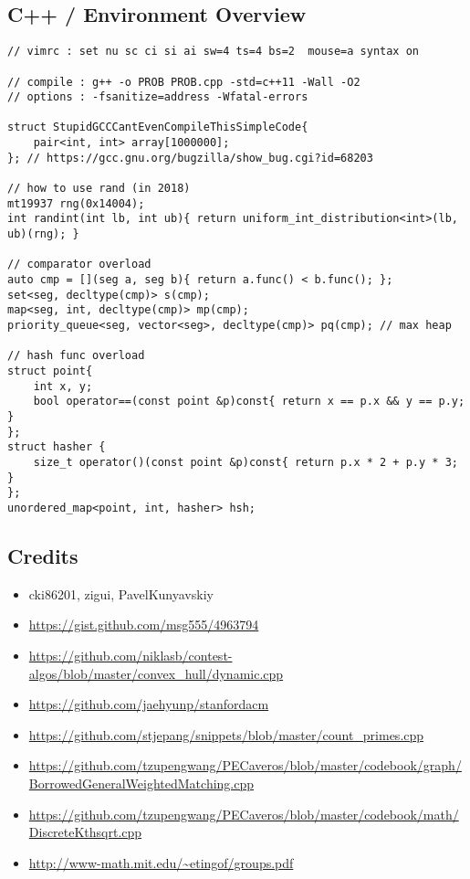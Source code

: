 \documentclass[landscape, 8pt, a4paper, oneside, twocolumn]{extarticle}
\begin{document}
\subsection {C++ / Environment Overview}
\begin{verbatim}
// vimrc : set nu sc ci si ai sw=4 ts=4 bs=2  mouse=a syntax on

// compile : g++ -o PROB PROB.cpp -std=c++11 -Wall -O2
// options : -fsanitize=address -Wfatal-errors

struct StupidGCCCantEvenCompileThisSimpleCode{
	pair<int, int> array[1000000];
}; // https://gcc.gnu.org/bugzilla/show_bug.cgi?id=68203

// how to use rand (in 2018)
mt19937 rng(0x14004);
int randint(int lb, int ub){ return uniform_int_distribution<int>(lb, ub)(rng); }

// comparator overload
auto cmp = [](seg a, seg b){ return a.func() < b.func(); };
set<seg, decltype(cmp)> s(cmp);
map<seg, int, decltype(cmp)> mp(cmp);
priority_queue<seg, vector<seg>, decltype(cmp)> pq(cmp); // max heap

// hash func overload
struct point{
    int x, y;
    bool operator==(const point &p)const{ return x == p.x && y == p.y; }
};
struct hasher {
    size_t operator()(const point &p)const{ return p.x * 2 + p.y * 3; }
};
unordered_map<point, int, hasher> hsh;
\end{verbatim}
\subsection {Credits}
\begin{itemize}[noitemsep,nolistsep]
	\item cki86201, zigui, PavelKunyavskiy
	\item \url{https://gist.github.com/msg555/4963794}
	\item \url{https://github.com/niklasb/contest-algos/blob/master/convex_hull/dynamic.cpp}
	\item \url{https://github.com/jaehyunp/stanfordacm}
	\item \url{https://github.com/stjepang/snippets/blob/master/count_primes.cpp}
	\item \url{https://github.com/tzupengwang/PECaveros/blob/master/codebook/graph/BorrowedGeneralWeightedMatching.cpp}
	\item \url{https://github.com/tzupengwang/PECaveros/blob/master/codebook/math/DiscreteKthsqrt.cpp}
	\item \url{http://www-math.mit.edu/~etingof/groups.pdf}
\end{itemize}
\end{document}
